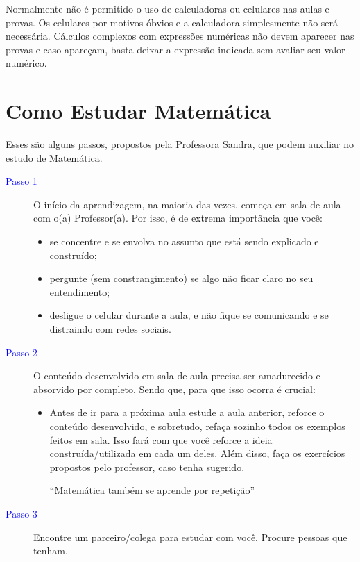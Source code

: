 Normalmente não é permitido o uso de calculadoras ou celulares nas aulas e provas. Os celulares por motivos óbvios
e a calculadora simplesmente não será necessária. Cálculos complexos com expressões numéricas não devem aparecer
nas provas e caso apareçam, basta deixar a expressão indicada sem avaliar seu valor numérico.

\section*{Como Estudar Matemática}

Esses são alguns passos, propostos pela Professora Sandra, que podem auxiliar no estudo de Matemática.
\begin{description}
    \item[\textcolor{blue}{Passo 1}] O início da aprendizagem, na maioria das vezes, começa em sala de aula com o(a) Professor(a).
        Por isso, é de extrema importância que você:
        \begin{itemize}
            \item se concentre e se envolva no assunto que está sendo explicado e construído;
            \item pergunte (sem constrangimento) se algo não ficar claro no seu entendimento;
            \item desligue o celular durante a aula, e não fique se comunicando e se distraindo com redes sociais.
        \end{itemize}
    \item[\textcolor{blue}{Passo 2}] O conteúdo desenvolvido em sala de aula precisa ser amadurecido e absorvido por completo.
        Sendo que, para que isso ocorra é crucial:
        \begin{itemize}
            \item Antes de ir para a próxima aula estude a aula anterior, reforce o conteúdo desenvolvido,
                e sobretudo, refaça sozinho todos os exemplos feitos em sala. Isso fará com que você reforce
                a ideia construída/utilizada em cada um deles. Além disso, faça os exercícios propostos pelo
                professor, caso tenha sugerido.
                \begin{center}
                    ``Matemática também se aprende por repetição''
                \end{center}
        \end{itemize}
    \item[\textcolor{blue}{Passo 3}] Encontre um parceiro/colega para estudar com você. Procure pessoas que tenham,

\end{description}
